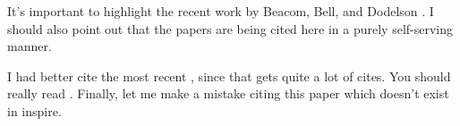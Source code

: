 It's important to highlight the recent
work by Beacom, Bell, and Dodelson \cite{Beacom:2004yd}. I should also point out that
the papers \cite{hep-th/0501240,1979PhLB...80..360E} are being cited here in a
purely self-serving manner.  

I had better cite the most recent \cite{CERN-W5013}, since that
gets quite a lot of cites. You should really read \cite{CERN-W5013}.
Finally, let me make a mistake citing this paper \cite{Garcia:2020ay} which
doesn't exist in inspire.

\begin{thebibliography}{99}


\end{thebibliography}



